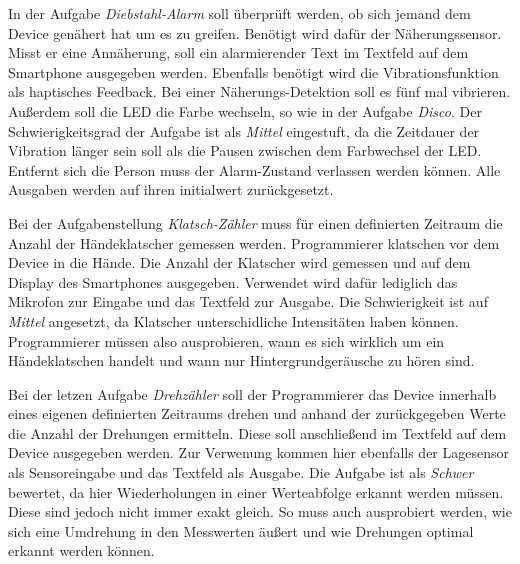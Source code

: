 \documentclass[11pt,a4paper]{report}
\begin{document}
In der Aufgabe \textit{Diebstahl-Alarm} soll überprüft werden, ob sich jemand dem Device genähert hat um es zu greifen.
Benötigt wird dafür der Näherungssensor.
Misst er eine Annäherung, soll ein alarmierender Text im Textfeld auf dem Smartphone ausgegeben werden.
Ebenfalls benötigt wird die Vibrationsfunktion als haptisches Feedback.
Bei einer Näherungs-Detektion soll es fünf mal vibrieren.
Außerdem soll die LED die Farbe wechseln, so wie in der Aufgabe \textit{Disco}.
Der Schwierigkeitsgrad der Aufgabe ist als \textit{Mittel} eingestuft, da die Zeitdauer der Vibration länger sein soll als die Pausen zwischen dem Farbwechsel der LED.
Entfernt sich die Person muss der Alarm-Zustand verlassen werden können.
Alle Ausgaben werden auf ihren initialwert zurückgesetzt.

Bei der Aufgabenstellung \textit{Klatsch-Zähler} muss für einen definierten Zeitraum die Anzahl der Händeklatscher gemessen werden.
Programmierer klatschen vor dem Device in die Hände.
Die Anzahl der Klatscher wird gemessen und auf dem Display des Smartphones ausgegeben.
Verwendet wird dafür lediglich das Mikrofon zur Eingabe und das Textfeld zur Ausgabe.
Die Schwierigkeit ist auf \textit{Mittel} angesetzt, da Klatscher unterschidliche Intensitäten haben können.
Programmierer müssen also ausprobieren, wann es sich wirklich um ein Händeklatschen handelt und wann nur Hintergrundgeräusche zu hören sind.

Bei der letzen Aufgabe \textit{Drehzähler} soll der Programmierer das Device innerhalb eines eigenen definierten Zeitraums drehen und anhand der zurückgegeben Werte die Anzahl der Drehungen ermitteln.
Diese soll anschließend im Textfeld auf dem Device ausgegeben werden.
Zur Verwenung kommen hier ebenfalls der Lagesensor als Sensoreingabe und das Textfeld als Ausgabe.
Die Aufgabe ist als \textit{Schwer} bewertet, da hier Wiederholungen in einer Werteabfolge erkannt werden müssen.
Diese sind jedoch nicht immer exakt gleich.
So muss auch ausprobiert werden, wie sich eine Umdrehung in den Messwerten äußert und wie Drehungen optimal erkannt werden können.
\end{document}
